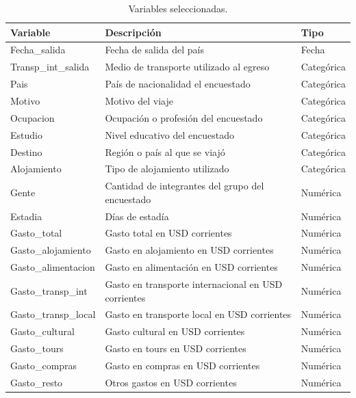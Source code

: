 \documentclass[
]{article}
\begin{document}
\begin{table}[hbpt]
    \centering
    \caption{Variables seleccionadas.} \label{tab:variables}
    \vspace{0.5cm}
    \begin{tabular}{lll}
    \hline
    \textbf{Variable} & \textbf{Descripción} & \textbf{Tipo} \\
    \hline
        Fecha\_salida & Fecha de salida del país & Fecha \\
        Transp\_int\_salida & Medio de transporte utilizado al egreso & Categórica \\
        Pais & País de nacionalidad el encuestado & Categórica \\
        Motivo & Motivo del viaje & Categórica \\
        Ocupacion & Ocupación o profesión del encuestado & Categórica \\
        Estudio & Nivel educativo del encuestado & Categórica \\
        Destino & Región o país al que se viajó & Categórica \\
        Alojamiento & Tipo de alojamiento utilizado & Categórica \\
        Gente & Cantidad de integrantes del grupo del encuestado & Numérica \\
        Estadia & Días de estadía & Numérica \\
        Gasto\_total & Gasto total en USD corrientes & Numérica \\
        Gasto\_alojamiento & Gasto en alojamiento en USD corrientes & Numérica \\
        Gasto\_alimentacion & Gasto en alimentación en USD corrientes & Numérica \\
        Gasto\_transp\_int & Gasto en transporte internacional en USD corrientes & Numérica \\
        Gasto\_transp\_local & Gasto en transporte local en USD corrientes & Numérica \\
        Gasto\_cultural & Gasto cultural en USD corrientes & Numérica \\
        Gasto\_tours & Gasto en tours en USD corrientes & Numérica \\
        Gasto\_compras & Gasto en compras en USD corrientes & Numérica \\
        Gasto\_resto & Otros gastos en USD corrientes & Numérica \\
    \end{tabular}
\end{table}
\end{document}
